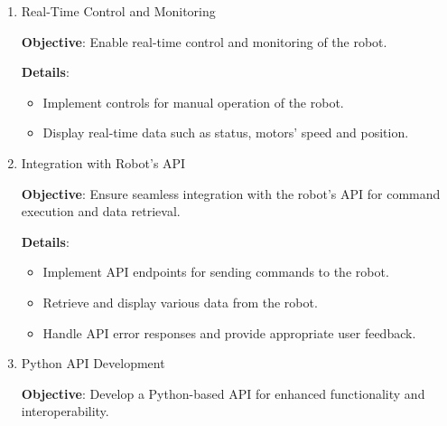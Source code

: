 \begin{enumerate}
    \item Real-Time Control and Monitoring
        
        \vspace{-1.5mm}
        \textbf{Objective}: Enable real-time control and monitoring of the robot.

        \vspace{-1.5mm}
        \textbf{Details}:
        \begin{itemize}
            \vspace{-1mm}
            \item Implement controls for manual operation of the robot.
            \vspace{-1mm}
            \item Display real-time data such as status, motors' speed and position.
        \end{itemize}


    \item Integration with Robot’s API
        
        \vspace{-1.5mm}
        \textbf{Objective}: Ensure seamless integration with the robot’s API for command execution and data retrieval.

        \vspace{-1.5mm}
        \textbf{Details}:
        \begin{itemize}
            \vspace{-1mm}
            \item Implement API endpoints for sending commands to the robot.
            \vspace{-1mm}
            \item Retrieve and display various data from the robot.
            \vspace{-1mm}
            \item Handle API error responses and provide appropriate user feedback.
        \end{itemize}

\newpage
    \item Python API Development
        
        \vspace{-1.5mm}
        \textbf{Objective}: Develop a Python-based API for enhanced functionality and interoperability.


\end{enumerate}
